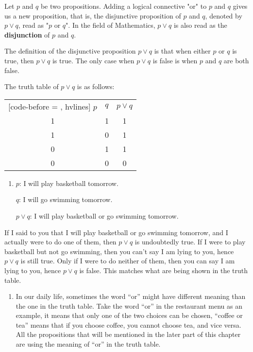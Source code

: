 \documentclass{report}
\begin{document}
Let $p$ and $q$ be two propositions. Adding a logical connective "or" to $p$
and $q$ gives us a new proposition, that is, the disjunctive proposition of $p$
and $q$, denoted by $p \lor q$, read as "$p$ or $q$". In the field of
Mathematics, $p \lor q$ is also read as the \textbf{disjunction} of $p$ and
$q$.

The definition of the disjunctive proposition $p \lor q$ is that when either
$p$ or $q$ is true, then $p \lor q$ is true. The only case when $p \lor q$ is
false is when $p$ and $q$ are both false.

The truth table of $p \lor q$ is as follows:
\begin{center}
    \begin{NiceTabular}{|c|c|c|}[code-before = , hvlines]
        $p$ & $q$ & $p \lor q$ \\
        1   & 1   & 1          \\
        1   & 0   & 1          \\
        0   & 1   & 1          \\
        0   & 0   & 0          \\
    \end{NiceTabular}
\end{center}
\begin{enumerate}[label=\indent For example, leftmargin=*]
    \item $p$: I will play basketball tomorrow.

          $q$: I will go swimming tomorrow.

          $p \lor q$: I will play basketball or go swimming tomorrow.
\end{enumerate}

If I said to you that I will play basketball or go swimming tomorrow, and I
actually were to do one of them, then $p \lor q$ is undoubtedly true. If I were
to play basketball but not go swimming, then you can't say I am lying to you,
hence $p \lor q$ is still true. Only if I were to do neither of them, then you
can say I am lying to you, hence $p \lor q$ is false. This matches what are
being shown in the truth table.
\begin{enumerate}[label=\textbf{NOTE: }, leftmargin=*]
    \item In our daily life, sometimes the word ``or'' might have different meaning than
          the one in the truth table. Take the word ``or'' in the restaurant menu as an
          example, it means that only one of the two choices can be chosen, ``coffee or
          tea'' means that if you choose coffee, you cannot choose tea, and vice versa.
          All the propositions that will be mentioned in the later part of this chapter
          are using the meaning of ``or'' in the truth table.
\end{enumerate}
\end{document}
